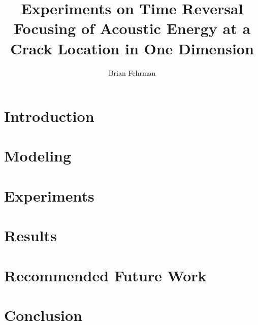 \documentclass[13pt]{ucthesis}
\author{Brian Fehrman}
\title{Experiments on Time Reversal Focusing of Acoustic Energy at a Crack Location in One Dimension}
\begin{document}
\maketitle


\begin{frontmatter}
\begin{abstract}
\end{abstract}
\printglossary
\tableofcontents
\listoffigures
\end{frontmatter}




\chapter{Introduction}\label{ch:Introduction}


\chapter{Modeling}\label{ch:Modeling}


\chapter{Experiments}\label{ch:Experiments}

\chapter{Results}\label{ch:Results}

\chapter{Recommended Future Work}\label{ch:RecommendedFutureWork}

\chapter{Conclusion}\label{ch:Conclusion}



\end{document}
